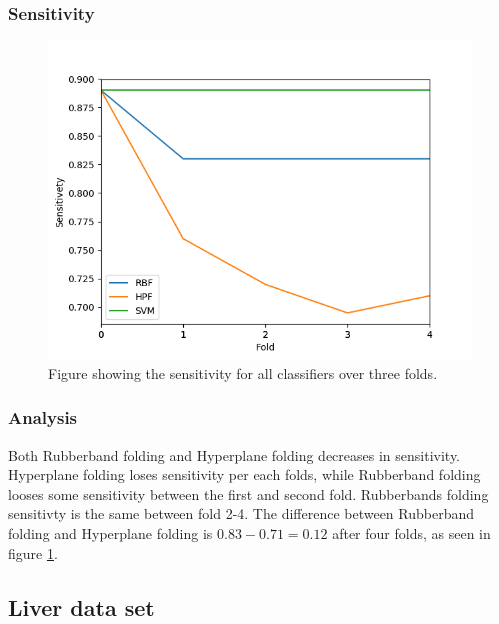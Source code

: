 \documentclass[a4paper,twoside]{bth}
\begin{document}
\subsubsection{Sensitivity}
\begin{figure}[!htb]
\centering
\includegraphics[scale=0.7]{images/result-hep/Sensitivety.png}
   \caption{Figure showing the sensitivity for all classifiers over three folds.}
   \label{fig:hep-Sensitivity}
\end{figure}

\FloatBarrier

\subsubsection{Analysis}
Both Rubberband folding and Hyperplane folding decreases in sensitivity. Hyperplane folding loses sensitivity per each folds, while Rubberband folding looses some sensitivity between the first and second fold. Rubberbands folding sensitivty is the same between fold 2-4. The difference between Rubberband folding and Hyperplane folding is $0.83 - 0.71 = 0.12$ after four folds, as seen in figure \ref{fig:hep-Sensitivity}.

\clearpage
\FloatBarrier

\subsection{Liver data set}
\FloatBarrier
\end{document}
